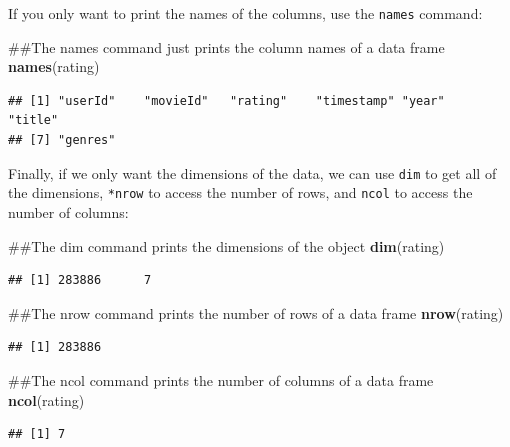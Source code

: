 \documentclass[]{book}
\newenvironment{Shaded}{\begin{snugshade}}{\end{snugshade}}
\newcommand{\KeywordTok}[1]{\textcolor[rgb]{0.13,0.29,0.53}{\textbf{{#1}}}}
\newcommand{\NormalTok}[1]{{#1}}
\begin{document}
If you only want to print the names of the columns, use the
\texttt{names} command:

\begin{Shaded}
\begin{Highlighting}[]
\NormalTok{##The names command just prints the column names of a data frame}
\KeywordTok{names}\NormalTok{(rating)}
\end{Highlighting}
\end{Shaded}

\begin{verbatim}
## [1] "userId"    "movieId"   "rating"    "timestamp" "year"      "title"    
## [7] "genres"
\end{verbatim}

Finally, if we only want the dimensions of the data, we can use
\texttt{dim} to get all of the dimensions, \texttt{*nrow} to access the
number of rows, and \texttt{ncol} to access the number of columns:

\begin{Shaded}
\begin{Highlighting}[]
\NormalTok{##The dim command prints the dimensions of the object}
\KeywordTok{dim}\NormalTok{(rating)}
\end{Highlighting}
\end{Shaded}

\begin{verbatim}
## [1] 283886      7
\end{verbatim}

\begin{Shaded}
\begin{Highlighting}[]
\NormalTok{##The nrow command prints the number of rows of a data frame}
\KeywordTok{nrow}\NormalTok{(rating)}
\end{Highlighting}
\end{Shaded}

\begin{verbatim}
## [1] 283886
\end{verbatim}

\begin{Shaded}
\begin{Highlighting}[]
\NormalTok{##The ncol command prints the number of columns of a data frame}
\KeywordTok{ncol}\NormalTok{(rating)}
\end{Highlighting}
\end{Shaded}

\begin{verbatim}
## [1] 7
\end{verbatim}
\end{document}
